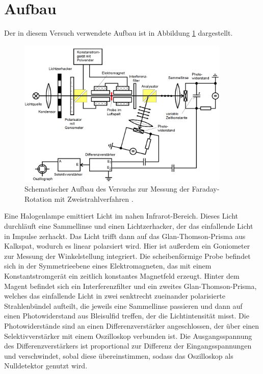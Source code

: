 \section{Aufbau}
Der in diesem Versuch verwendete Aufbau ist in Abbildung \ref{fig:aufbau} dargestellt.
\FloatBarrier
\begin{figure}[h]
    \centering
    \includegraphics[width=0.9\textwidth]{aufbau.png}
    \caption{Schematischer Aufbau des Versuchs zur Messung der Faraday-Rotation mit Zweistrahlverfahren \cite{quelle03}.}
    \label{fig:aufbau}
\end{figure}
\FloatBarrier
\noindent
Eine Halogenlampe emittiert Licht im nahen Infrarot-Bereich. Dieses Licht durchläuft eine Sammellinse und einen 
Lichtzerhacker, der das einfallende Licht in Impulse zerhackt. Das Licht trifft dann auf das Glan-Thomson-Prisma aus
Kalkspat, wodurch es linear polarsiert wird. Hier ist außerdem ein Goniometer zur Messung der Winkelstellung integriert. 
Die scheibenförmige Probe befindet sich in der Symmetrieebene eines Elektromagneten, das mit einem Konstantstromgerät 
ein zeitlich konstantes Magnetfeld erzeugt. Hinter dem Magent befindet sich ein Interferenzfilter und ein zweites 
Glan-Thomson-Prisma, welches das einfallende Licht in zwei senktrecht zueinander polarisierte Strahlenbündel aufteilt,
die jeweils eine Sammellinse passieren und dann auf einen Photowiderstand aus Bleisulfid treffen, der die Lichtintensität misst. 
Die Photowiderstände sind an einen Differenzverstärker angeschlossen, der über einen Selektivverstärker mit
einem Oszilloskop verbunden ist. Die Ausgangsspannung des Differenzverstärkers ist proportional zur Differenz der 
Eingangsspannungen und verschwindet, sobal diese übereinstimmen, sodass das Oszilloskop als Nulldetektor genutzt wird.


